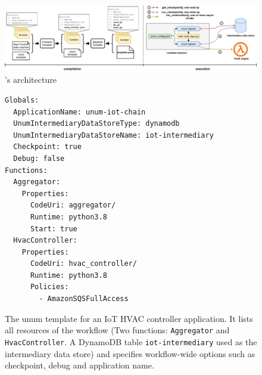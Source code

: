 %
%

\begin{figure}[t]
    \centering
    \includegraphics[width=\textwidth]{figures/unum-arch.pdf}
    \caption{\name{}'s architecture}
    \label{fig:arch}
\end{figure}

\begin{figure}[]
    \begin{verbatim}
Globals:
  ApplicationName: unum-iot-chain
  UnumIntermediaryDataStoreType: dynamodb
  UnumIntermediaryDataStoreName: iot-intermediary
  Checkpoint: true
  Debug: false
Functions:
  Aggregator:
    Properties:
      CodeUri: aggregator/
      Runtime: python3.8
      Start: true
  HvacController:
    Properties:
      CodeUri: hvac_controller/
      Runtime: python3.8
      Policies:
        - AmazonSQSFullAccess
  \end{verbatim}
    \caption{The unum template for an IoT HVAC controller
    application. It lists all resources of the workflow (Two functions:
    \texttt{Aggregator} and \texttt{HvacController}. A DynamoDB table
    \texttt{iot-intermediary} used as the intermediary data store) and
    specifies workflow-wide options such as checkpoint, debug and
    application name.}
    \label{fig:iot-unum-template}
\end{figure}



